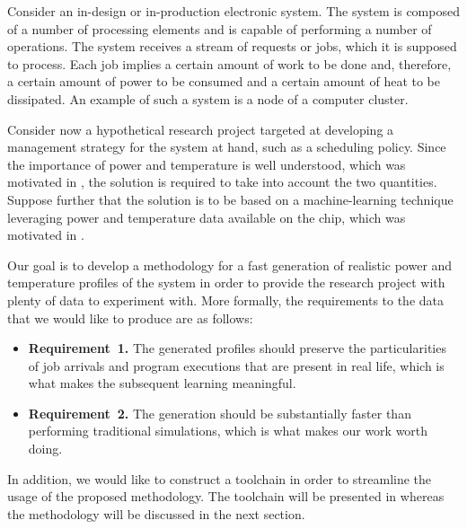 Consider an in-design or in-production electronic system. The system is composed
of a number of processing elements and is capable of performing a number of
operations. The system receives a stream of requests or jobs, which it is
supposed to process. Each job implies a certain amount of work to be done and,
therefore, a certain amount of power to be consumed and a certain amount of heat
to be dissipated. An example of such a system is a node of a computer cluster.

Consider now a hypothetical research project targeted at developing a management
strategy for the system at hand, such as a scheduling policy. Since the
importance of power and temperature is well understood, which was motivated in
, the solution is required to take into account the two
quantities. Suppose further that the solution is to be based on a
machine-learning technique leveraging power and temperature data available on
the chip, which was motivated in .

Our goal is to develop a methodology for a fast generation of realistic power
and temperature profiles of the system in order to provide the research project
with plenty of data to experiment with. More formally, the requirements to the
data that we would like to produce are as follows:

\begin{itemize}
  \item {\bfseries Requirement~1.} The generated profiles should preserve the
  particularities of job arrivals and program executions that are present in
  real life, which is what makes the subsequent learning meaningful.

  \item {\bfseries Requirement~2.} The generation should be substantially faster
  than performing traditional simulations, which is what makes our work worth
  doing.
\end{itemize}

In addition, we would like to construct a toolchain in order to streamline the
usage of the proposed methodology. The toolchain will be presented in
 whereas the methodology will be discussed in the next section.
